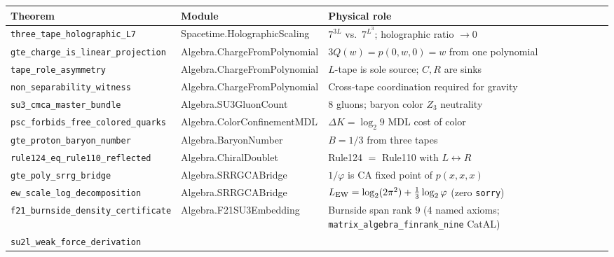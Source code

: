 \documentclass[11pt,a4paper]{article}
\theoremstyle{definition}
\begin{document}
\begin{table}[h]
\centering\footnotesize
\setlength{\tabcolsep}{4pt}
\begin{tabular}{@{}p{5.2cm}p{4.8cm}p{4.0cm}@{}}
\toprule
Theorem & Module & Physical role \\
\midrule
\texttt{three\_\allowbreak tape\_\allowbreak holographic\_\allowbreak L7}
  & Spacetime.HolographicScaling
  & $7^{3L}$ vs.\ $7^{L^3}$; holographic ratio $\to 0$ \\[1pt]
\texttt{gte\_\allowbreak charge\_\allowbreak is\_\allowbreak linear\_\allowbreak projection}
  & Algebra.ChargeFromPolynomial
  & $3Q(w)=p(0,w,0)=w$ from one polynomial \\[1pt]
\texttt{tape\_\allowbreak role\_\allowbreak asymmetry}
  & Algebra.ChargeFromPolynomial
  & $L$-tape is sole source; $C,R$ are sinks \\[1pt]
\texttt{non\_\allowbreak separability\_\allowbreak witness}
  & Algebra.ChargeFromPolynomial
  & Cross-tape coordination required for gravity \\[1pt]
\texttt{su3\_\allowbreak cmca\_\allowbreak master\_\allowbreak bundle}
  & Algebra.SU3GluonCount
  & 8 gluons; baryon color $Z_3$ neutrality \\[1pt]
\texttt{psc\_\allowbreak forbids\_\allowbreak free\_\allowbreak colored\_\allowbreak quarks}
  & Algebra.ColorConfinementMDL
  & $\Delta K=\log_2 9$ MDL cost of color \\[1pt]
\texttt{gte\_\allowbreak proton\_\allowbreak baryon\_\allowbreak number}
  & Algebra.BaryonNumber
  & $B=1/3$ from three tapes \\[1pt]
\texttt{rule124\_\allowbreak eq\_\allowbreak rule110\_\allowbreak reflected}
  & Algebra.ChiralDoublet
  & Rule124 $=$ Rule110 with $L\!\leftrightarrow\!R$ \\[1pt]
\texttt{gte\_\allowbreak poly\_\allowbreak srrg\_\allowbreak bridge}
  & Algebra.SRRGCABridge
  & $1/\varphi$ is CA fixed point of $p(x,x,x)$ \\[1pt]
\texttt{ew\_\allowbreak scale\_\allowbreak log\_\allowbreak decomposition}
  & Algebra.SRRGCABridge
  & $L_{\rm EW}=\log_2(2\pi^2)+\tfrac{1}{3}\log_2\varphi$ (zero \texttt{sorry}) \\[1pt]
\texttt{f21\_\allowbreak burnside\_\allowbreak density\_\allowbreak certificate}
  & Algebra.F21SU3Embedding
  & Burnside span rank $9$ (4 named axioms; \texttt{matrix\_algebra\_finrank\_nine} CatAL) \\[1pt]
\texttt{su2l\_\allowbreak weak\_\allowbreak force\_\allowbreak derivation}

\end{tabular}
\end{table}
\end{document}

